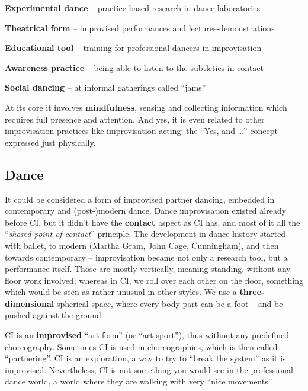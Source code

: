 \begin{itemize*}
	\item [] \textbf{Experimental dance} -- practice-based research in dance laboratories
	\item [] \textbf{Theatrical form} -- improvised performances and lectures-demonstrations
	\item [] \textbf{Educational tool} -- training for professional dancers in improvisation
	\item [] \textbf{Awareness practice} -- being able to listen to the subtleties in contact
	\item [] \textbf{Social dancing} -- at informal gatherings called ``jams''
\end{itemize*}

At its core it involves \textbf{mindfulness}, sensing and collecting information which requires full presence and attention.
And yes, it is even related to other improvisation practices like improvisation acting: the ``Yes, and \ldots''-concept expressed just physically.

\subsection{Dance}\label{subsec:dance}

It could be considered a form of improvised partner dancing, embedded in contemporary and (post-)modern dance.
Dance improvisation existed already before CI, but it didn't have the \textbf{contact} aspect as CI has, and most of it all the ``\textit{shared point of contact}'' principle.
The development in dance history started with ballet, to modern (Martha Gram, John Cage, Cunningham), and then towards contemporary -- improvisation became not only a research tool, but a performance itself.
Those are mostly vertically, meaning standing, without any floor work involved; whereas in CI, we roll over each other on the floor, something which would be seen as rather unusual in other styles.
We use a \textbf{three-dimensional} spherical space, where every body-part can be a foot -- and be pushed against the ground.

CI is an \textbf{improvised} ``art-form'' (or ``art-sport''), thus without any predefined choreography.
Sometimes CI is used in choreographies, which is then called ``partnering''.
CI is an exploration, a way to try to ``break the system'' as it is improvised.
Nevertheless, CI is not something you would see in the professional dance world, a world where they are walking with very ``nice movements''.

